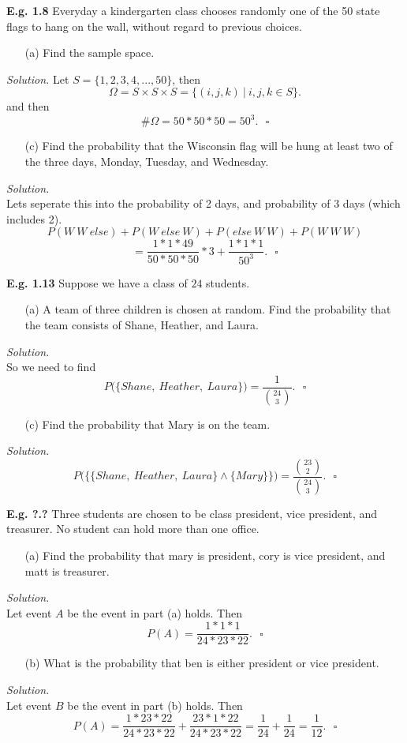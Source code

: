 \documentclass[12pt]{book}
\begin{document}
\noindent \textbf{E.g. 1.8} Everyday a kindergarten class chooses randomly one of the 50 state flags to hang on the wall, without regard to previous choices.
\begin{itemize}\item [(a)] Find the sample space.\end{itemize}
\textit{Solution.} Let $S=\{1,2,3,4,...,50\}$, then 
$$\Omega=S\times S\times S = \big\{(i,j,k) ~\big|~ i,j,k\in S \big\}.$$
and then $$\#\Omega = 50*50*50 = 50^3.~~~\square$$
\begin{itemize}\item [(c)] Find the probability that the Wisconsin flag will be hung at least two of the three days, Monday, Tuesday, and Wednesday.\end{itemize}
\textit{Solution.}\\
Lets seperate this into the probability of 2 days, and probability of 3 days (which includes 2).\\
$$P(W~W~else)+P(W~else~W)+P(else~W~W)+P(W~W~W) $$
$$= \frac{1*1*49}{50*50*50}*3+\frac{1*1*1}{50^3}.~~~\square$$

\newpage
\noindent \textbf{E.g. 1.13} Suppose we have a class of $24$ students.
\begin{itemize}\item [(a)] A team of three children is chosen at random. Find the probability that the team consists of Shane, Heather, and Laura.\end{itemize}
\textit{Solution.} \\
So we need to find 
$$P\big(\{Shane, ~Heather, ~Laura\}\big) = \frac{1}{{24 \choose 3}}.~~~\square$$
\begin{itemize}\item [(c)] Find the probability that Mary is on the team.\end{itemize}
\textit{Solution.} 
$$P\Big(\big\{ \{Shane, ~Heather, ~Laura\} \land \{Mary\} \big\}\Big) = \frac{{23\choose 2}}{{24\choose 3}}.~~~\square$$

\noindent \textbf{E.g. ?.?} Three students are chosen to be class president, vice president, and treasurer. No student can hold more than one office. \\
\begin{itemize}\item [(a)] Find the probability that mary is president, cory is vice president, and matt is treasurer.\end{itemize}
\textit{Solution.}\\
Let event $A$ be the event in part (a) holds. Then 
$$P(A) = \frac{1*1*1}{24*23*22}.~~~\square$$
\begin{itemize}\item [(b)] What is the probability that ben is either president or vice president.\end{itemize}
\textit{Solution.}\\
Let event $B$ be the event in part (b) holds. Then 
$$P(A) = \frac{1*23*22}{24*23*22} + \frac{23*1*22}{24*23*22} = \frac{1}{24}+\frac{1}{24} = \frac{1}{12}.~~~\square$$
\end{document}
